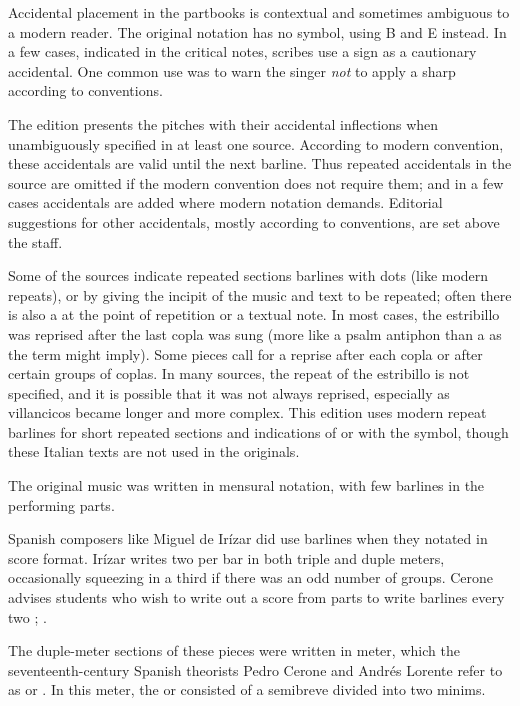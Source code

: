 Accidental placement in the partbooks is contextual and sometimes ambiguous to 
a modern reader.
The original notation has no \na{} symbol, using B\sh{} and E\sh{} instead.
In a few cases, indicated in the critical notes, scribes use a \sh{} sign as a 
cautionary accidental.
One common use was to warn the singer \emph{not} to apply a sharp according 
to  conventions.%
  \autocites{Harran:Cautionary1}{Harran:Cautionary2}

The edition presents the pitches with their accidental inflections when 
unambiguously specified in at least one source.
According to modern convention, these accidentals are valid until the next 
barline.
Thus repeated accidentals in the source are omitted if the modern convention 
does not require them; and in a few cases accidentals are added where modern 
notation demands.
Editorial suggestions for other accidentals, mostly according to  conventions, are set above the staff.

Some of the sources indicate repeated sections barlines with dots (like modern
repeats), or by giving the incipit of the music and text to be repeated; often
there is also a  at the point of repetition or a
textual note.
In most cases, the estribillo was reprised after the last copla was sung (more
like a psalm antiphon than a  as the term might imply).
Some pieces call for a reprise after each copla or after certain groups of
coplas.
In many sources, the repeat of the estribillo is not specified, and it is
possible that it was not always reprised, especially as villancicos became
longer and more complex.%
    \Autocite{Torrente:Estribillo}
This edition uses modern repeat barlines for short repeated sections and
indications of  or  with the
\musSegno{} symbol, though these Italian texts are not used in the originals.

The original music was written in mensural notation, with few barlines in the 
performing parts.%
\begin{Footnote}
    Spanish composers like Miguel de Irízar did use barlines when they notated in 
    score format.
    Irízar writes two  per bar in both triple and duple meters,
    occasionally squeezing in a third  if there was an odd number
    of groups.
    Cerone advises students who wish to write out a score from parts to write 
    barlines every two ; \textcite[745]{Cerone:Melopeo}.
\end{Footnote}
The duple-meter sections of these pieces were written in \meterC{} meter, which
the seventeenth-century Spanish theorists Pedro Cerone and Andrés Lorente refer
to as  or .%
  \Autocites[537]{Cerone:Melopeo}[156, 210]{Lorente:Porque}
In this meter, the  or  consisted of a semibreve 
divided into two minims.%
  \Autocites{GonzalezValle:MusicaTexto}{GonzalezValle:CompasCabezon}

